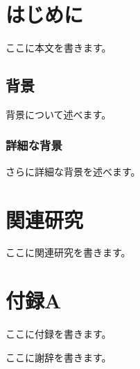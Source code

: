 \documentclass{japanese_thesis}
\begin{document}
\maketitle

\tableofcontents

\mainmatter

\chapter{はじめに}
ここに本文を書きます。

\section{背景}
背景について述べます。

\subsection{詳細な背景}
さらに詳細な背景を述べます。

\chapter{関連研究}
ここに関連研究を書きます。

\appendixmatter

\chapter{付録A}
ここに付録を書きます。

\acknowledgmentsmatter
ここに謝辞を書きます。

\bibliographymatter
\end{document}
